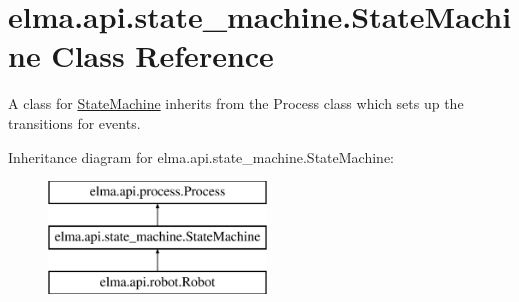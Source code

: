 \hypertarget{classelma_1_1api_1_1state__machine_1_1StateMachine}{}\section{elma.\+api.\+state\+\_\+machine.\+State\+Machine Class Reference}
\label{classelma_1_1api_1_1state__machine_1_1StateMachine}


A class for \hyperlink{classelma_1_1api_1_1state__machine_1_1StateMachine}{State\+Machine} inherits from the Process class which sets up the transitions for events.  


Inheritance diagram for elma.\+api.\+state\+\_\+machine.\+State\+Machine\+:\begin{figure}[H]
\begin{center}
\leavevmode
\includegraphics[height=3.000000cm]{classelma_1_1api_1_1state__machine_1_1StateMachine}
\end{center}
\end{figure}
